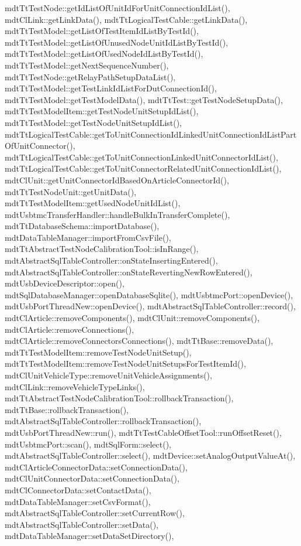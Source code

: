 mdt\-Tt\-Test\-Node\-::get\-Id\-List\-Of\-Unit\-Id\-For\-Unit\-Connection\-Id\-List(), mdt\-Cl\-Link\-::get\-Link\-Data(), mdt\-Tt\-Logical\-Test\-Cable\-::get\-Link\-Data(), mdt\-Tt\-Test\-Model\-::get\-List\-Of\-Test\-Item\-Id\-List\-By\-Test\-Id(), mdt\-Tt\-Test\-Model\-::get\-List\-Of\-Unused\-Node\-Unit\-Id\-List\-By\-Test\-Id(), mdt\-Tt\-Test\-Model\-::get\-List\-Of\-Used\-Node\-Id\-List\-By\-Test\-Id(), mdt\-Tt\-Test\-Model\-::get\-Next\-Sequence\-Number(), mdt\-Tt\-Test\-Node\-::get\-Relay\-Path\-Setup\-Data\-List(), mdt\-Tt\-Test\-Model\-::get\-Test\-Link\-Id\-List\-For\-Dut\-Connection\-Id(), mdt\-Tt\-Test\-Model\-::get\-Test\-Model\-Data(), mdt\-Tt\-Test\-::get\-Test\-Node\-Setup\-Data(), mdt\-Tt\-Test\-Model\-Item\-::get\-Test\-Node\-Unit\-Setup\-Id\-List(), mdt\-Tt\-Test\-Model\-::get\-Test\-Node\-Unit\-Setup\-Id\-List(), mdt\-Tt\-Logical\-Test\-Cable\-::get\-To\-Unit\-Connection\-Id\-Linked\-Unit\-Connection\-Id\-List\-Part\-Of\-Unit\-Connector(), mdt\-Tt\-Logical\-Test\-Cable\-::get\-To\-Unit\-Connection\-Linked\-Unit\-Connector\-Id\-List(), mdt\-Tt\-Logical\-Test\-Cable\-::get\-To\-Unit\-Connector\-Related\-Unit\-Connection\-Id\-List(), mdt\-Cl\-Unit\-::get\-Unit\-Connector\-Id\-Based\-On\-Article\-Connector\-Id(), mdt\-Tt\-Test\-Node\-Unit\-::get\-Unit\-Data(), mdt\-Tt\-Test\-Model\-Item\-::get\-Used\-Node\-Unit\-Id\-List(), mdt\-Usbtmc\-Transfer\-Handler\-::handle\-Bulk\-In\-Transfer\-Complete(), mdt\-Tt\-Database\-Schema\-::import\-Database(), mdt\-Data\-Table\-Manager\-::import\-From\-Csv\-File(), mdt\-Tt\-Abstract\-Test\-Node\-Calibration\-Tool\-::is\-In\-Range(), mdt\-Abstract\-Sql\-Table\-Controller\-::on\-State\-Inserting\-Entered(), mdt\-Abstract\-Sql\-Table\-Controller\-::on\-State\-Reverting\-New\-Row\-Entered(), mdt\-Usb\-Device\-Descriptor\-::open(), mdt\-Sql\-Database\-Manager\-::open\-Database\-Sqlite(), mdt\-Usbtmc\-Port\-::open\-Device(), mdt\-Usb\-Port\-Thread\-New\-::open\-Device(), mdt\-Abstract\-Sql\-Table\-Controller\-::record(), mdt\-Cl\-Article\-::remove\-Components(), mdt\-Cl\-Unit\-::remove\-Components(), mdt\-Cl\-Article\-::remove\-Connections(), mdt\-Cl\-Article\-::remove\-Connectors\-Connections(), mdt\-Tt\-Base\-::remove\-Data(), mdt\-Tt\-Test\-Model\-Item\-::remove\-Test\-Node\-Unit\-Setup(), mdt\-Tt\-Test\-Model\-Item\-::remove\-Test\-Node\-Unit\-Setups\-For\-Test\-Item\-Id(), mdt\-Cl\-Unit\-Vehicle\-Type\-::remove\-Unit\-Vehicle\-Assignments(), mdt\-Cl\-Link\-::remove\-Vehicle\-Type\-Links(), mdt\-Tt\-Abstract\-Test\-Node\-Calibration\-Tool\-::rollback\-Transaction(), mdt\-Tt\-Base\-::rollback\-Transaction(), mdt\-Abstract\-Sql\-Table\-Controller\-::rollback\-Transaction(), mdt\-Usb\-Port\-Thread\-New\-::run(), mdt\-Tt\-Test\-Cable\-Offset\-Tool\-::run\-Offset\-Reset(), mdt\-Usbtmc\-Port\-::scan(), mdt\-Sql\-Form\-::select(), mdt\-Abstract\-Sql\-Table\-Controller\-::select(), mdt\-Device\-::set\-Analog\-Output\-Value\-At(), mdt\-Cl\-Article\-Connector\-Data\-::set\-Connection\-Data(), mdt\-Cl\-Unit\-Connector\-Data\-::set\-Connection\-Data(), mdt\-Cl\-Connector\-Data\-::set\-Contact\-Data(), mdt\-Data\-Table\-Manager\-::set\-Csv\-Format(), mdt\-Abstract\-Sql\-Table\-Controller\-::set\-Current\-Row(), mdt\-Abstract\-Sql\-Table\-Controller\-::set\-Data(), mdt\-Data\-Table\-Manager\-::set\-Data\-Set\-Directory(), 